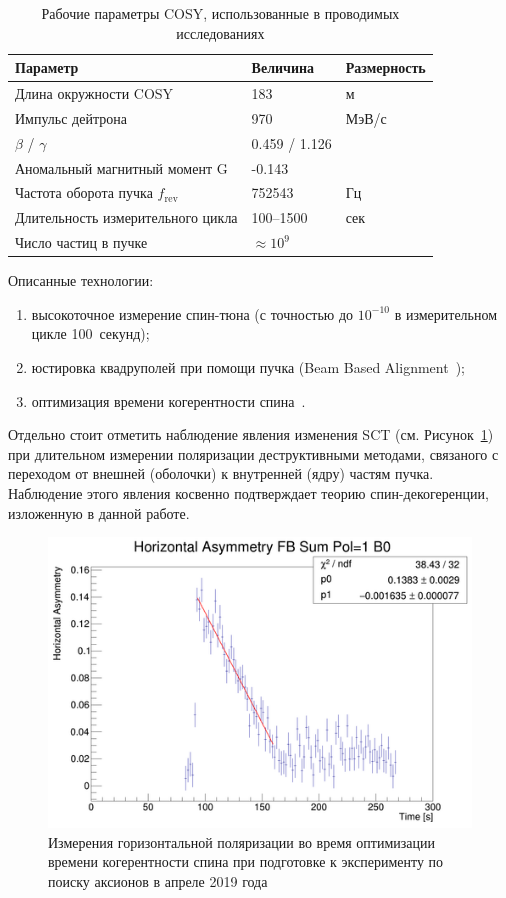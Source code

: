 \begin{table}[H]\centering
	\caption{Рабочие параметры COSY, использованные в проводимых исследованиях\label{tbl:COSY-studies}}
	\begin{tabular}{lll}
		\toprule
		Параметр & Величина & Размерность \\
		\midrule
		Длина окружности COSY& 183 & м\\
		Импульс дейтрона & 970 & МэВ/с \\
		$\beta$ / $\gamma$ & 0.459 / 1.126 & \\
		Аномальный магнитный момент G& -0.143& \\
		Частота оборота пучка $f_{\mathrm{rev}}$& 752543& Гц\\
		Длительность измерительного цикла& 100--1500& сек\\
		Число частиц в пучке & $\approx 10^9$& \\
		\bottomrule
	\end{tabular}
\end{table}

Описанные технологии:
\begin{enumerate}[(1)]
	\item высокоточное измерение спин-тюна (с точностью до $10^{-10}$ в измерительном цикле 100~секунд);
	\item юстировка квадруполей при помощи пучка (Beam Based Alignment~\cite{Wagner:BBA2018});
	\item оптимизация времени когерентности спина~\cite{COSY:SCT:IPAC15, Guidoboni:STORI14}.
\end{enumerate} 

Отдельно стоит отметить наблюдение явления изменения SCT (см. Рисунок~\ref{fig:April2019:Polarization}) 
при длительном измерении поляризации деструктивными методами, связаного с переходом 
от внешней (оболочки) к внутренней (ядру) частям пучка. 
Наблюдение этого явления косвенно подтверждает теорию спин-декогеренции, изложенную в данной работе.

\begin{figure}[H]\centering
	\includegraphics[height=.3\paperheight]{images/chapter4/SCT-April-2019/11th_20-20}
\caption{Измерения горизонтальной поляризации во время оптимизации времени когерентности спина при подготовке к эксперименту по поиску аксионов в апреле 2019 года\label{fig:April2019:Polarization}}
\end{figure}
